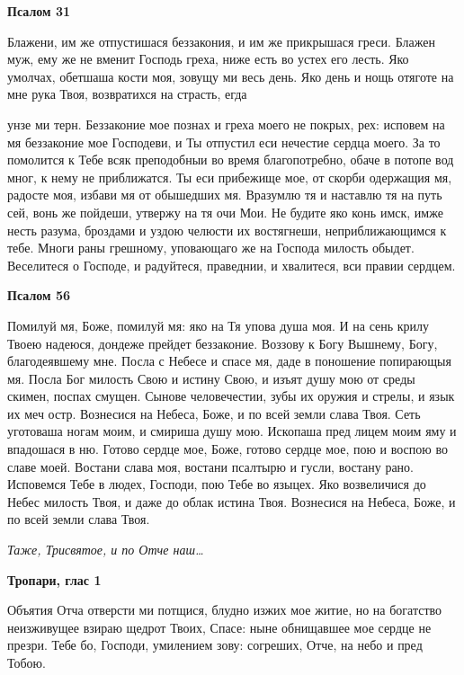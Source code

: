  

\bfseries Псалом 31\normalfont{}


   Блажени, им же отпустишася беззакония, и им же прикрышася греси.
Блажен муж, ему же не вменит Господь греха, ниже есть во устех его
лесть. Яко умолчах, обетшаша кости моя, зовущу ми весь день. Яко
день и нощь отяготе на мне рука Твоя, возвратихся на страсть, егда

унзе ми терн. Беззаконие мое познах и греха моего не покрых, рех:
исповем на мя беззаконие мое Господеви, и Ты отпустил еси нечестие
сердца моего. За то помолится к Тебе всяк преподобныи во время
благопотребно, обаче в потопе вод мног, к нему не приближатся. Ты еси
прибежище мое, от скорби одержащия мя, радосте моя, избави мя от
обышедших мя. Вразумлю тя и наставлю тя на путь сей, вонь же пойдеши,
утвержу на тя очи Мои. Не будите яко конь имск, имже несть разума,
броздами и уздою челюсти их востягнеши, неприближающимся к тебе.
Многи раны грешному, уповающаго же на Господа милость обыдет.
Веселитеся о Господе, и радуйтеся, праведнии, и хвалитеся, вси правии
сердцем.



 

\bfseries Псалом 56\normalfont{}


   Помилуй мя, Боже, помилуй мя: яко на Тя упова душа моя. И на сень
крилу Твоею надеюся, дондеже прейдет беззаконие. Воззову к Богу
Вышнему, Богу, благодеявшему мне. Посла с Небесе и спасе мя, даде в
поношение попирающыя мя. Посла Бог милость Свою и истину Свою, и
изъят душу мою от среды скимен, поспах смущен. Сынове человечестии,
зубы их оружия и стрелы, и язык их меч остр. Вознесися на Небеса, Боже, и
по всей земли слава Твоя. Сеть уготоваша ногам моим, и смириша душу
мою. Ископаша пред лицем моим яму и впадошася в ню. Готово сердце мое,
Боже, готово сердце мое, пою и воспою во славе моей. Востани слава моя,
востани псалтырю и гусли, востану рано. Исповемся Тебе в людех, Господи,
пою Тебе во языцех. Яко возвеличися до Небес милость Твоя, и даже до
облак истина Твоя. Вознесися на Небеса, Боже, и по всей земли слава
Твоя.


 \itshape Таже,\normalfont{} \itshape Трисвятое\normalfont{}, \itshape и по\normalfont{} Отче наш…



 

\bfseries Тропари, глас 1\normalfont{}


   Объятия Отча отверсти ми потщися, блудно изжих мое житие, но на
богатство неизживущее взираю щедрот Твоих, Спасе: ныне обнищавшее мое
сердце не презри. Тебе бо, Господи, умилением зову: согреших, Отче, на небо
и пред Тобою.



